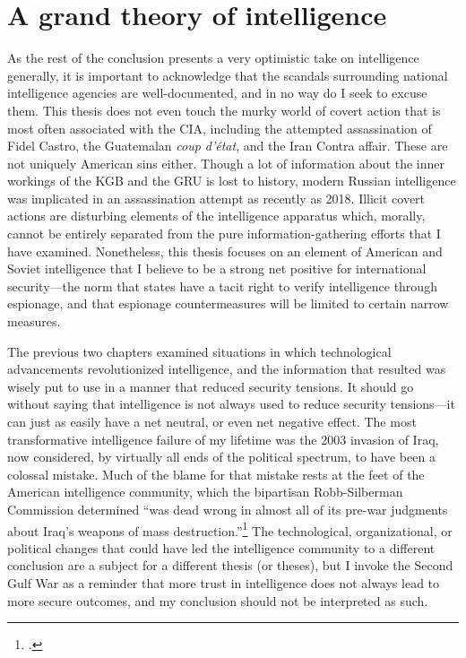 \documentclass{report}
\begin{document}
\section{A grand theory of intelligence}


As the rest of the conclusion presents a very optimistic take on intelligence generally, it is important to acknowledge that the scandals surrounding national intelligence agencies are well-documented, and in no way do I seek to excuse them. This thesis does not even touch the murky world of covert action that is most often associated with the CIA, including the attempted assassination of Fidel Castro, the Guatemalan \emph{coup d'\'etat}, and the Iran Contra affair. These are not uniquely American sins either. Though a lot of information about the inner workings of the KGB and the GRU is lost to history, modern Russian intelligence was implicated in an assassination attempt as recently as 2018. Illicit covert actions are disturbing elements of the intelligence apparatus which, morally, cannot be entirely separated from the pure information-gathering efforts that I have examined. Nonetheless, this thesis focuses on an element of American and Soviet intelligence that I believe to be a strong net positive for international security---the norm that states have a tacit right to verify intelligence through espionage, and that espionage countermeasures will be limited to certain narrow measures.

The previous two chapters examined situations in which technological advancements revolutionized intelligence, and the information that resulted was wisely put to use in a manner that reduced security tensions. It should go without saying that intelligence is not always used to reduce security tensions---it can just as easily have a net neutral, or even net negative effect. The most transformative intelligence failure of my lifetime was the 2003 invasion of Iraq, now considered, by virtually all ends of the political spectrum, to have been a colossal mistake. Much of the blame for that mistake rests at the feet of the American intelligence community, which the bipartisan Robb-Silberman Commission determined ``was dead wrong in almost all of its pre-war judgments about Iraq's weapons of mass destruction.''\footcite{commission_on_the_intelligence_capabilities_of_the_united_states_regarding_wmds_final_2005} The technological, organizational, or political changes that could have led the intelligence community to a different conclusion are a subject for a different thesis (or theses), but I invoke the Second Gulf War as a reminder that more trust in intelligence does not always lead to more secure outcomes, and my conclusion should not be interpreted as such.
\end{document}
